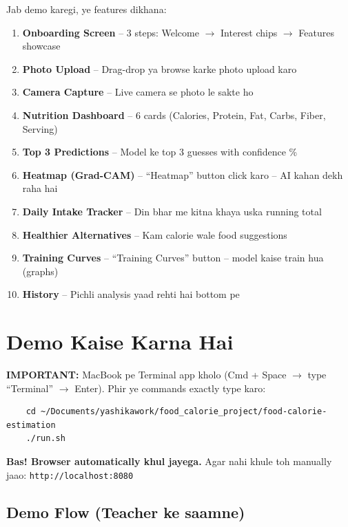 \documentclass[11pt,a4paper]{article}
\begin{document}
Jab demo karegi, ye features dikhana:

\begin{enumerate}[leftmargin=1.2cm]
\item \textbf{Onboarding Screen} -- 3 steps: Welcome $\rightarrow$ Interest chips $\rightarrow$ Features showcase
\item \textbf{Photo Upload} -- Drag-drop ya browse karke photo upload karo
\item \textbf{Camera Capture} -- Live camera se photo le sakte ho
\item \textbf{Nutrition Dashboard} -- 6 cards (Calories, Protein, Fat, Carbs, Fiber, Serving)
\item \textbf{Top 3 Predictions} -- Model ke top 3 guesses with confidence \%
\item \textbf{Heatmap (Grad-CAM)} -- ``Heatmap'' button click karo -- AI kahan dekh raha hai
\item \textbf{Daily Intake Tracker} -- Din bhar me kitna khaya uska running total
\item \textbf{Healthier Alternatives} -- Kam calorie wale food suggestions
\item \textbf{Training Curves} -- ``Training Curves'' button -- model kaise train hua (graphs)
\item \textbf{History} -- Pichli analysis yaad rehti hai bottom pe
\end{enumerate}

\section{Demo Kaise Karna Hai}
\label{sec:demo}

\begin{warnbox}
\textbf{IMPORTANT:} MacBook pe Terminal app kholo (Cmd + Space $\rightarrow$ type ``Terminal'' $\rightarrow$ Enter). Phir ye commands exactly type karo:
\end{warnbox}

\begin{verbatim}
    cd ~/Documents/yashikawork/food_calorie_project/food-calorie-estimation
    ./run.sh
\end{verbatim}

\textbf{Bas! Browser automatically khul jayega.} Agar nahi khule toh manually jaao: \texttt{http://localhost:8080}

\subsection{Demo Flow (Teacher ke saamne)}
\end{document}
